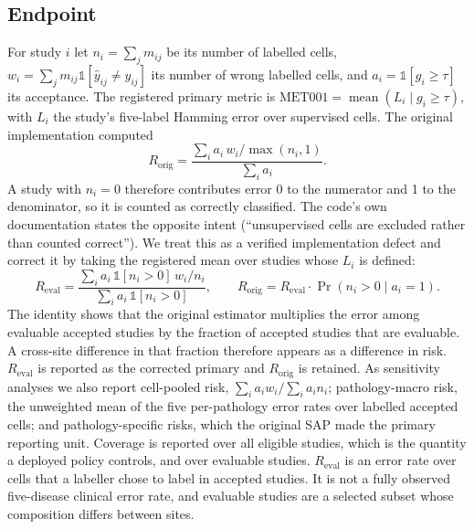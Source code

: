 \subsection{Endpoint}
\label{sec:endpoint}
For study $i$ let $n_i=\sum_j m_{ij}$ be its number of labelled cells,
$w_i=\sum_j m_{ij}\mathbb{1}[\hat y_{ij}\ne y_{ij}]$ its number of wrong
labelled cells, and $a_i=\mathbb{1}[g_i\ge\tau]$ its acceptance. The registered
primary metric is $\mathrm{MET001}=\operatorname{mean}(L_i\mid g_i\ge\tau)$, with
$L_i$ the study's five-label Hamming error over supervised cells. The
original implementation computed
\begin{equation}
R_{\text{orig}}=\frac{\sum_i a_i\,w_i/\max(n_i,1)}{\sum_i a_i}.
\end{equation}
A study with $n_i=0$ therefore contributes error 0 to the numerator and 1 to
the denominator, so it is counted as correctly classified. The code's own
documentation states the opposite intent (``unsupervised cells are excluded
rather than counted correct''). We treat this as a verified implementation
defect and correct it by taking the registered mean over studies whose $L_i$
is defined:
\begin{equation}
R_{\text{eval}}=\frac{\sum_i a_i\,\mathbb{1}[n_i>0]\,w_i/n_i}{\sum_i a_i\,\mathbb{1}[n_i>0]},
\qquad R_{\text{orig}} = R_{\text{eval}}\cdot\Pr(n_i>0\mid a_i=1).
\end{equation}
The identity shows that the original estimator multiplies the error among
evaluable accepted studies by the fraction of accepted studies that are
evaluable. A cross-site difference in that fraction therefore appears as a
difference in risk. $R_{\text{eval}}$ is reported as the corrected primary and
$R_{\text{orig}}$ is retained. As sensitivity analyses we also report
cell-pooled risk, $\sum_i a_iw_i/\sum_i a_in_i$; pathology-macro risk, the
unweighted mean of the five per-pathology error rates over labelled accepted
cells; and pathology-specific risks, which the original SAP made the primary
reporting unit. Coverage is reported over all eligible studies, which is the
quantity a deployed policy controls, and over evaluable studies.
$R_{\text{eval}}$ is an error rate over cells that a labeller chose to label in
accepted studies. It is not a fully observed five-disease clinical error rate,
and evaluable studies are a selected subset whose composition differs between
sites.


